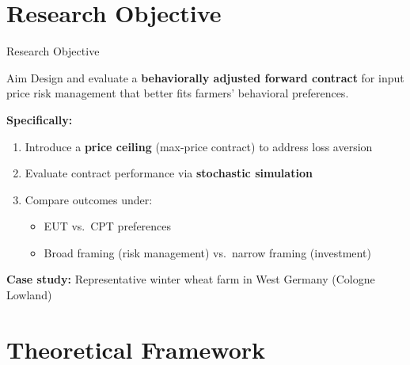 \documentclass[aspectratio=169,12pt]{beamer}
\begin{document}
\section{Research Objective}

\begin{frame}{Research Objective}
\begin{block}{Aim}
Design and evaluate a \textbf{behaviorally adjusted forward contract} for input price risk management that better fits farmers' behavioral preferences.
\end{block}

\vspace{0.5em}
\textbf{Specifically:}
\begin{enumerate}
    \item Introduce a \textbf{price ceiling} (max-price contract) to address loss aversion
    \item Evaluate contract performance via \textbf{stochastic simulation}
    \item Compare outcomes under:
    \begin{itemize}
        \item EUT vs.\ CPT preferences
        \item Broad framing (risk management) vs.\ narrow framing (investment)
    \end{itemize}
\end{enumerate}

\vspace{0.5em}
\textbf{Case study:} Representative winter wheat farm in West Germany (Cologne Lowland)
\end{frame}

\section{Theoretical Framework}
\end{document}

